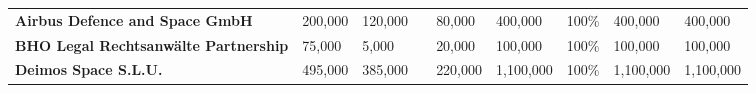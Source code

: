 \begin{table}[H]
{\begin{tabular}{p{5cm}p{2cm}p{2cm}p{2.5cm}p{2cm}p{2cm}p{2cm}p{2cm}p{2cm}}
\textbf{Airbus Defence and Space GmbH}       & 200,000                                                                                               & 120,000                                                                                         &                                                                                                                & 80,000                                                                                     & 400,000                                                                                                    & 100\%                                                                                                & 400,000                                                                                             & 400,000                                                                                               \\
\textbf{BHO Legal Rechtsanwälte Partnership} & 75,000                                                                                                & 5,000                                                                                           &                                                                                                                & 20,000                                                                                     & 100,000                                                                                                    & 100\%                                                                                                & 100,000                                                                                             & 100,000                                                                                               \\
\textbf{Deimos Space S.L.U.}                 & 495,000                                                                                               & 385,000                                                                                         &                                                                                                                & 220,000                                                                                    & 1,100,000                                                                                                  & 100\%                                                                                                & 1,100,000                                                                                           & 1,100,000                                                                                             \\

\end{tabular}}
\end{table}
